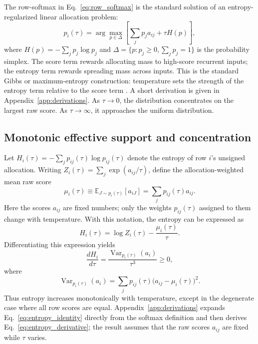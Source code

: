 \documentclass[preprint,12pt,authoryear]{elsarticle}
\begin{document}
The row-softmax in Eq.~\eqref{eq:row_softmax} is the standard solution of an entropy-regularized linear allocation problem:
\begin{equation}
  p_i(\tau)=\arg\max_{p\in\Delta}\left[\sum_j p_j a_{ij}+\tau H(p)\right],
  \label{eq:entropy_regularized_allocation}
\end{equation}
where $H(p)=-\sum_j p_j\log p_j$ and $\Delta=\{p:p_j\ge 0,\sum_j p_j=1\}$ is the probability simplex. The score term rewards allocating mass to high-score recurrent inputs; the entropy term rewards spreading mass across inputs. This is the standard Gibbs or maximum-entropy construction: temperature sets the strength of the entropy term relative to the score term \citep{jaynes1957information}. A short derivation is given in Appendix~\ref{app:derivations}. As $\tau\rightarrow 0$, the distribution concentrates on the largest raw score. As $\tau\rightarrow\infty$, it approaches the uniform distribution.

\subsection{Monotonic effective support and concentration}

Let $H_i(\tau)=-\sum_j p_{ij}(\tau)\log p_{ij}(\tau)$ denote the entropy of row $i$'s unsigned allocation. Writing $Z_i(\tau)=\sum_j\exp(a_{ij}/\tau)$, define the allocation-weighted mean raw score
\[
  \mu_i(\tau)
  \equiv \mathbb{E}_{J\sim p_i(\tau)}[a_{iJ}]
  =\sum_j p_{ij}(\tau)a_{ij}.
\]
Here the scores $a_{ij}$ are fixed numbers; only the weights $p_{ij}(\tau)$ assigned to them change with temperature. With this notation, the entropy can be expressed as
\begin{equation}
  H_i(\tau)=\log Z_i(\tau)-\frac{\mu_i(\tau)}{\tau}.
  \label{eq:entropy_identity}
\end{equation}
Differentiating this expression yields
\begin{equation}
  \frac{d H_i}{d\tau}
  =\frac{\operatorname{Var}_{p_i(\tau)}(a_i)}{\tau^3}\ge 0,
  \label{eq:entropy_derivative}
\end{equation}
where
\[
  \operatorname{Var}_{p_i(\tau)}(a_i)
  =\sum_j p_{ij}(\tau)\bigl(a_{ij}-\mu_i(\tau)\bigr)^2.
\]
Thus entropy increases monotonically with temperature, except in the degenerate case where all row scores are equal. Appendix~\ref{app:derivations} expands Eq.~\eqref{eq:entropy_identity} directly from the softmax definition and then derives Eq.~\eqref{eq:entropy_derivative}; the result assumes that the raw scores $a_{ij}$ are fixed while $\tau$ varies.
\end{document}
